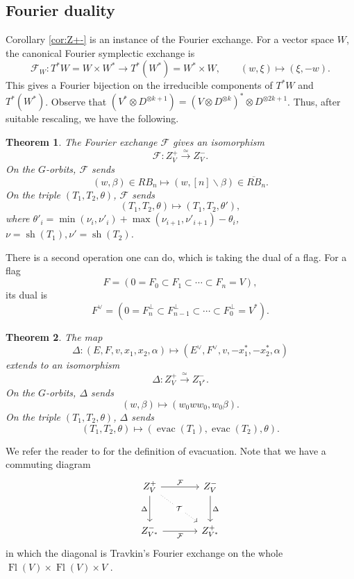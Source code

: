 \documentclass[12pt,a4paper]{article}
\def\Fl{\operatorname{Fl}}
\def\FlVV{\Fl(V) \times \Fl(V)}
\def\sh{\operatorname{sh}}
\def\evac{\operatorname{evac}}
\theoremstyle{plain}
\newtheorem{thm}{Theorem}[section]
\theoremstyle{definition}
\theoremstyle{remark}
\newcommand{\cF}{\mathcal{F}}
\begin{document}
\subsection{Fourier duality}

    Corollary \ref{cor:Z+-} is an instance of the Fourier exchange. For a vector space $W$, the canonical Fourier symplectic exchange is
    \[
    \cF_W:T^*W=W\times W^* \longrightarrow T^*(W^*)=W^*\times W,\qquad
    (w,\xi)\longmapsto(\xi,-w).
    \]
    This gives a Fourier bijection on the irreducible components of $T^*W$ and $T^*(W^*)$. Observe that $(V^*\otimes D^{\otimes k+1}) = (V\otimes D^{\otimes k})^* \otimes D^{\otimes 2k+1}$. Thus, after suitable rescaling, we have the following.

    \begin{thm}\label{thm:Fourier-V}
        The Fourier exchange $\cF$ gives an isomorphism
        \[
        \cF:Z_V^+\xrightarrow{\simeq} Z_V^-.
        \]
        On the $G$-orbits, $\cF$ sends
        \[
        (w,\beta) \in RB_n \mapsto (w,[n]\backslash \beta) \in \overline{RB}_n.
        \]
        On the triple $(T_1,T_2,\theta)$, $\cF$ sends
        \[
        (T_1,T_2,\theta) \mapsto (T_1,T_2,\theta'),
        \]
        where $\theta'_i = \min(\nu_i,\nu'_i) + \max(\nu_{i+1},\nu'_{i+1}) - \theta_i$, $\nu = \sh(T_1), \nu' = \sh(T_2)$.
    \end{thm}

    There is a second operation one can do, which is taking the dual of a flag. For a flag
    \[
    F = (0 = F_0 \subset F_1 \subset \cdots \subset F_n = V),
    \]
    its dual is
    \[
    F^\vee = (0 = F_n^\perp \subset F_{n-1}^\perp \subset \cdots \subset F_0^\perp = V^*).
    \]

    \begin{thm}\label{thm:Fourier-flag}
        The map
        \[
        \Delta:(E,F,v,x_1,x_2,\alpha) \mapsto (E^\vee,F^\vee,v,-x_1^*,-x_2^*,\alpha)
        \]
        extends to an isomorphism
        \[
        \Delta:Z^+_V \xrightarrow{\simeq} Z^-_{V^*}.
        \]
        On the $G$-orbits, $\Delta$ sends
        \[
        (w,\beta) \mapsto (w_0ww_0,w_0 \beta).
        \]
        On the triple $(T_1,T_2,\theta)$, $\Delta$ sends
        \[
        (T_1,T_2,\theta) \mapsto (\evac(T_1),\evac(T_2),\theta).
        \]
    \end{thm}

    We refer the reader to \cite{stanley2008promotion} for the definition of evacuation. Note that we have a commuting diagram
    \[\begin{tikzcd}[sep = scriptsize]
    	{Z^+_V} && {Z^-_V} \\
    	\\
    	{Z^-_{V^*}} && {Z^+_{V^*}}
    	\arrow["{\cF}", from=1-1, to=1-3]
    	\arrow["\Delta"', from=1-1, to=3-1]
    	\arrow["\Delta", from=1-3, to=3-3]
    	\arrow["{\cF}"', from=3-1, to=3-3]
        \arrow["{\mathcal{T}}"{description}, dotted, from=1-1, to=3-3]
    \end{tikzcd}\]
    in which the diagonal is Travkin's Fourier exchange on the whole $\FlVV \times V$ \cite[Section 5.3]{travkin2009mirabolic}.
\end{document}
